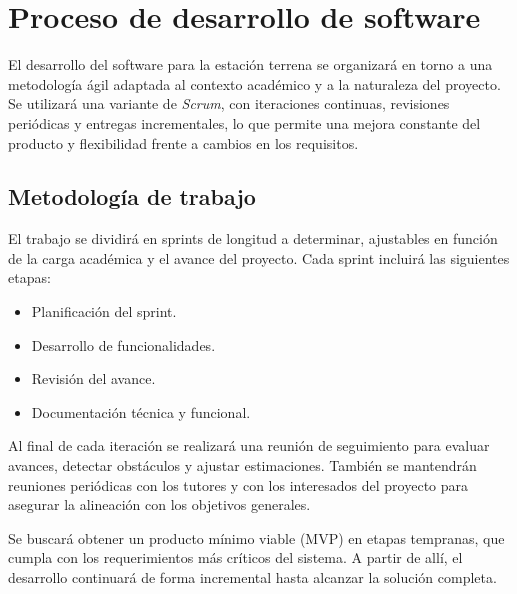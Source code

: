 
\section*{Proceso de desarrollo de software}

El desarrollo del software para la estación terrena se organizará en torno a una metodología ágil adaptada al contexto académico y a la naturaleza del proyecto. Se utilizará una variante de \textit{Scrum}, con iteraciones continuas, revisiones periódicas y entregas incrementales, lo que permite una mejora constante del producto y flexibilidad frente a cambios en los requisitos.

\subsection*{Metodología de trabajo}

El trabajo se dividirá en sprints de longitud a determinar, ajustables en función de la carga académica y el avance del proyecto. Cada sprint incluirá las siguientes etapas:

\begin{itemize}
    \item Planificación del sprint.
    \item Desarrollo de funcionalidades.
    \item Revisión del avance.
    \item Documentación técnica y funcional.
\end{itemize}

Al final de cada iteración se realizará una reunión de seguimiento para evaluar avances, detectar obstáculos y ajustar estimaciones. También se mantendrán reuniones periódicas con los tutores y con los interesados del proyecto para asegurar la alineación con los objetivos generales.

Se buscará obtener un producto mínimo viable (MVP) en etapas tempranas, que cumpla con los requerimientos más críticos del sistema. A partir de allí, el desarrollo continuará de forma incremental hasta alcanzar la solución completa.

